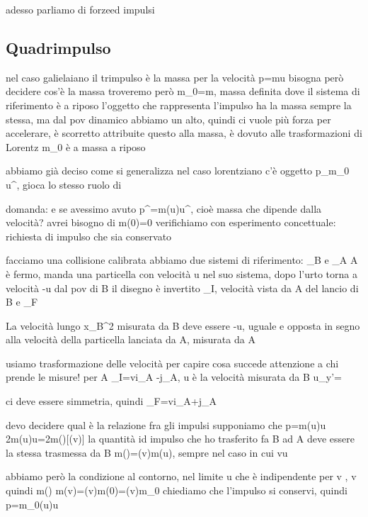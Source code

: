 {adesso parliamo di forzeed impulsi
\subsection{Quadrimpulso}
nel caso galielaiano il trimpulso è la massa per la velocità
	\vba p=m\vba u
bisogna però decidere cos'è la massa
troveremo però m_0=m, massa definita dove il sistema di riferimento è a riposo 
l'oggetto che rappresenta l'impulso ha la massa sempre la stessa, ma dal pov dinamico abbiamo un \gamma alto, quindi ci vuole più forza per accelerare, è scorretto attribuite questo alla massa, è dovuto alle trasformazioni di Lorentz
	m_0 è a massa a riposo
	
abbiamo già deciso come si generalizza
nel caso lorentziano c'è oggetto p_\mu\equiv m_0 u^\mu, gioca lo stesso ruolo di \tau 

domanda: e se avessimo avuto p^\mu=m(u)u^\mu, cioè massa che dipende dalla velocità?
avrei bisogno di m(0)=0
verifichiamo con esperimento concettuale: richiesta di impulso che sia conservato


facciamo una collisione calibrata
abbiamo due sistemi di riferimento: _B e _A
A è fermo, manda una particella con velocità \vba u nel suo sistema, dopo l'urto torna a velocità -\vba u
dal pov di B il disegno è invertito
	\vba \omega_I, velocità vista da A del lancio di B e \vba\omega_F
	
La velocità lungo x_B^2 misurata da B deve essere -\vba u, uguale e opposta in segno alla velocità della particella lanciata da A, misurata da A

usiamo trasformazione delle velocità per capire cosa succede
attenzione a chi prende le misure!
	per A \vba \omega_I=v\hat i_A -\vba j_A, u è la velocità misurata da B
	u_y'=

ci deve essere simmetria, quindi 	
	\vba \omega_F=v\hat i_A+\hat j_A
	
devo decidere qual è la relazione fra gli impulsi
supponiamo che 
	\vba p=m(u)\vba u
	2m(u)u=2m(\omega)[\gamma(v)]
	la quantità id impulso che ho trasferito fa B ad A deve essere la stessa trasmessa da B
	\implies m(\omega)=\gamma(v)m(u), sempre nel caso in cui \vba v\bot\vba u
	
abbiamo però la condizione al contorno, nel limite u che è indipendente per v
, \omega\rightarrow v
quindi 
	m(\omega) m(v)=\gamma(v)m(0)=\gamma(v)m_0
chiediamo che l'impulso si conservi, quindi \vba p=m_0\gamma(u)\vba u

}
